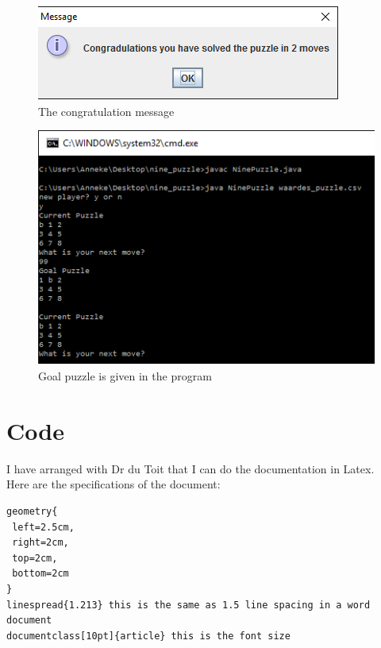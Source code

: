 \documentclass[10pt]{article}
\begin{document}
\begin{figure}
\centering
\includegraphics[scale=0.8]{./Prente/prent6.png}
\caption{The congratulation message}
\label{prent6}
\end{figure}

\begin{figure}
\centering
\includegraphics[scale=0.6]{./Prente/prent7.png}
\caption{Goal puzzle is given in the program}
\label{prent7}
\end{figure}

\section{Code}
 \begin{scriptsize}
 
 \end{scriptsize}

 

I have arranged with Dr du Toit that I can do the documentation in Latex.
\\Here are the specifications of the document:
\begin{verbatim}
geometry{
 left=2.5cm,
 right=2cm,
 top=2cm,
 bottom=2cm
}
linespread{1.213} this is the same as 1.5 line spacing in a word document
documentclass[10pt]{article} this is the font size
\end{verbatim}
\end{document}
